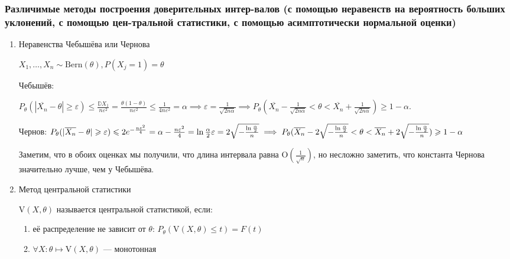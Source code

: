 \subsubsection{Различимые методы построения доверительных интер-валов (с помощью неравенств на вероятность больших уклонений, с помощью цен-тральной статистики, с помощью асимптотически нормальной оценки)}

\begin{enumerate}
    \item Неравенства Чебышёва или Чернова
    
    $X_1, \dots, X_n \sim \text{Bern}(\theta), P(X_j = 1) = \theta$

    Чебышёв: 
    
    $P_\theta(|\overline{X_n} - \theta| \geq \varepsilon) \leq \frac{\mathbb{D}X_1}{n\varepsilon^2} = 
    \frac{\theta(1 - \theta)}{n \varepsilon^2} \leq \frac{1}{4n\varepsilon^2} = \alpha
    \implies \varepsilon = \frac{1}{\sqrt{2n\alpha}}
    \implies P_\theta(\overline{X_n} - \frac{1}{\sqrt{2n\alpha}} < \theta < \overline{X_n} + \frac{1}{\sqrt{2n\alpha}}) \geq 1 - \alpha$.

    Чернов: 
    $
    P_\theta(|\overline{X_n} - \theta| \geq \varepsilon) \leq 2e^{-\frac{n\varepsilon^2}{4}} = \alpha
    \\
    -\frac{n\varepsilon^2}{4} = \ln{\frac{\alpha}{2}}
    \\
    \varepsilon = 2\sqrt{-\frac{\ln{\frac{\alpha}{2}}}{n}}
    \\
    \implies P_\theta(\overline{X_n} - 2\sqrt{-\frac{\ln{\frac{\alpha}{2}}}{n}} < \theta < \overline{X_n} + 2\sqrt{-\frac{\ln{\frac{\alpha}{2}}}{n}}) \geq 1 - \alpha
    $

    Заметим, что в обоих оценках мы получили, что длина интервала равна $\text{O}(\frac{1}{\sqrt{n}})$,
    но несложно заметить, что константа Чернова значительно лучше, чем у Чебышёва.

    \item Метод центральной статистики
    
    \begin{definition*}
        $\text{V}(X, \theta)$ называется центральной статистикой, если:
        \begin{enumerate}
            \item её распределение не зависит
            от $\theta$: $P_\theta(\text{V}(X, \theta) \leq t) = F(t)$
            \item $\forall X \colon \theta \mapsto \text{V}(X, \theta)$ --- монотонная
        \end{enumerate} 
    \end{definition*}


\end{enumerate}
